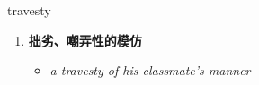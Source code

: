 
\begin{frame}
{\huge travesty}
\begin{center}
\begin{enumerate}\Large
  \item \textbf{拙劣、嘲弄性的模仿}
  \begin{itemize}
    \item \em{\Large{a travesty of his classmate's manner}}
  \end{itemize}
\end{enumerate}
\end{center}
\end{frame}
